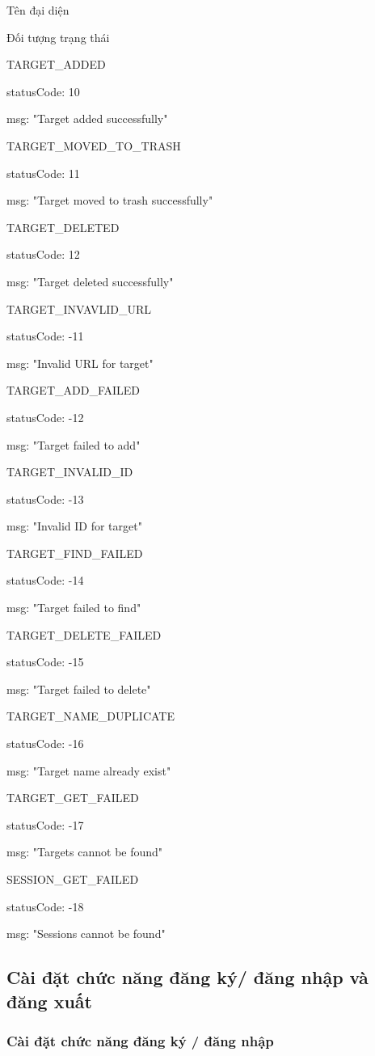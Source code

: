 Tên đại diện

Đối tượng trạng thái

TARGET\_ADDED

statusCode: 10

msg: "Target added successfully"

TARGET\_MOVED\_TO\_TRASH

statusCode: 11

msg: "Target moved to trash successfully"

TARGET\_DELETED

statusCode: 12

msg: "Target deleted successfully"

TARGET\_INVAVLID\_URL

statusCode: -11

msg: "Invalid URL for target"

TARGET\_ADD\_FAILED

statusCode: -12

msg: "Target failed to add"

TARGET\_INVALID\_ID

statusCode: -13

msg: "Invalid ID for target"

TARGET\_FIND\_FAILED

statusCode: -14

msg: "Target failed to find"

TARGET\_DELETE\_FAILED

statusCode: -15

msg: "Target failed to delete"

TARGET\_NAME\_DUPLICATE

statusCode: -16

msg: "Target name already exist"

TARGET\_GET\_FAILED

statusCode: -17

msg: "Targets cannot be found"

SESSION\_GET\_FAILED

statusCode: -18

msg: "Sessions cannot be found"

\subsection{Cài đặt chức năng đăng ký/ đăng nhập và đăng xuất}

\subsubsection{Cài đặt chức năng đăng ký / đăng nhập}

